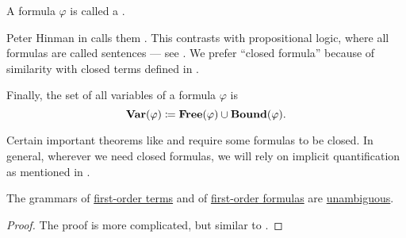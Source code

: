 \begin{definition}
\begin{thmenum}
    \cite[def. 2.2.7]{Hinman2005} A formula \( \varphi \) is called a .

    Peter Hinman in \cite[def. 2.2.7]{Hinman2005} calls them . This contrasts with propositional logic, where all formulas are called sentences --- see . We prefer \enquote{closed formula} because of similarity with closed terms defined in .

     Finally, the set of all variables of a formula \( \varphi \) is
    \begin{equation}\label{eq:def:first_order_syntax/formula_variables}
      \operatorname{\mathbf{Var}}(\varphi) \coloneqq \operatorname{\mathbf{Free}}(\varphi) \cup \operatorname{\mathbf{Bound}}(\varphi).
    \end{equation}
  \end{thmenum}
\end{definition}
\begin{comments}
  \item Certain important theorems like  and  require some formulas to be closed. In general, wherever we need closed formulas, we will rely on implicit quantification as mentioned in .
\end{comments}

\begin{proposition}\label{thm:first_order_terms_and_formulas_are_unambiguous}
  The grammars of \hyperref[def:first_order_syntax/term]{first-order terms} and of \hyperref[def:first_order_syntax/formula]{first-order formulas} are \hyperref[def:grammar_ambiguity]{unambiguous}.
\end{proposition}
\begin{proof}
  The proof is more complicated, but similar to .
\end{proof}


